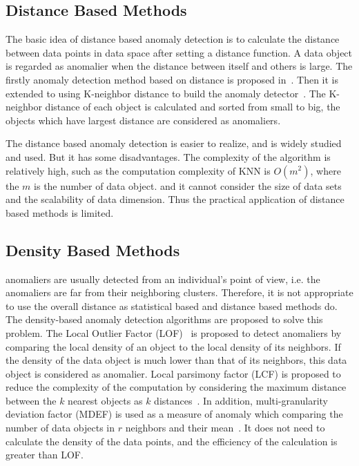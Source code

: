 \subsection{Distance Based Methods}

The basic idea of distance based anomaly detection
is to calculate the distance between data points in
data space after setting a distance function.
A data object is regarded as anomalier when
the distance between  itself and others is large.
The firstly anomaly detection method
based on distance is proposed in~\cite{knorr1997unified}.
Then it is extended to using K-neighbor distance to
build the anomaly detector~\cite{ramaswamy2000efficient,kuang2008anomaly}.
The K-neighbor distance of each object is calculated and
sorted from small to big,
the objects which have largest
distance are considered as anomaliers.

The distance based anomaly detection
is easier to realize,
and is widely studied and used.
But it has some disadvantages.
The complexity of the algorithm is relatively high,
such as the computation complexity of KNN is $O(m^2)$,
where the $m$ is the number of data object.
and it cannot consider the size of
data sets and the scalability of data dimension.
Thus the practical application of distance based methods is limited.

\subsection{Density Based Methods}

anomaliers are usually detected from an individual's point of view,
i.e.
the anomaliers are far from their neighboring clusters.
Therefore,
it is not appropriate to use the overall distance as statistical based and distance based methods do.
The density-based anomaly detection algorithms are proposed to solve this problem.
The Local Outlier Factor (LOF)~\cite{breunig2000lof}
is proposed to detect anomaliers by comparing the local density of an object to the local density of its neighbors.
If the density of the data object is
much lower than that of its neighbors,
this data object is considered as anomalier.
Local parsimony factor (LCF) is proposed to
reduce the complexity of the
computation by considering the maximum distance between
the $k$ nearest objects as $k$ distances~\cite{agyemang2004algorithm}.
In addition,
multi-granularity deviation factor (MDEF) is used as a measure of anomaly which comparing the number of data objects in $r$ neighbors and their mean~\cite{papadimitriou2003loci}.
It does not need to calculate the density of the data points,
and the efficiency of the calculation is greater than LOF.

